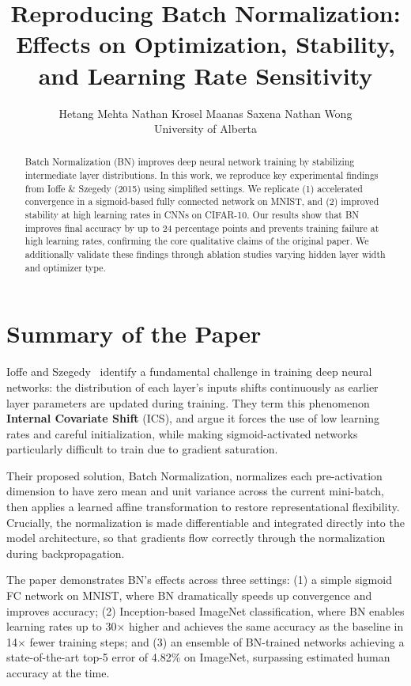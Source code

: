 \documentclass{article}
\title{Reproducing Batch Normalization: Effects on Optimization, Stability, and Learning Rate Sensitivity}
\author{
  Hetang Mehta \quad Nathan Krosel \quad Maanas Saxena \quad Nathan Wong \\
  University of Alberta
}
\begin{document}
\maketitle

\begin{abstract}
Batch Normalization (BN) improves deep neural network training by stabilizing intermediate layer
distributions. In this work, we reproduce key experimental findings from Ioffe \& Szegedy (2015)
using simplified settings. We replicate (1) accelerated convergence in a sigmoid-based fully
connected network on MNIST, and (2) improved stability at high learning rates in CNNs on
CIFAR-10. Our results show that BN improves final accuracy by up to 24 percentage points and
prevents training failure at high learning rates, confirming the core qualitative claims of the
original paper. We additionally validate these findings through ablation studies varying hidden
layer width and optimizer type.
\end{abstract}


\section{Summary of the Paper}

Ioffe and Szegedy~\cite{ioffe2015batch} identify a fundamental challenge in training deep neural
networks: the distribution of each layer's inputs shifts continuously as earlier layer parameters
are updated during training. They term this phenomenon \textbf{Internal Covariate Shift} (ICS),
and argue it forces the use of low learning rates and careful initialization, while making
sigmoid-activated networks particularly difficult to train due to gradient saturation.

Their proposed solution, Batch Normalization, normalizes each pre-activation dimension to have
zero mean and unit variance across the current mini-batch, then applies a learned affine
transformation to restore representational flexibility. Crucially, the normalization is made
differentiable and integrated directly into the model architecture, so that gradients flow
correctly through the normalization during backpropagation.

The paper demonstrates BN's effects across three settings: (1) a simple sigmoid FC network on
MNIST, where BN dramatically speeds up convergence and improves accuracy; (2) Inception-based
ImageNet classification, where BN enables learning rates up to 30$\times$ higher and achieves
the same accuracy as the baseline in 14$\times$ fewer training steps; and (3) an ensemble of
BN-trained networks achieving a state-of-the-art top-5 error of 4.82\% on ImageNet, surpassing
estimated human accuracy at the time.
\end{document}
